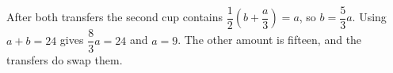 After both transfers the second cup contains $\dfrac{1}{2}(b+\dfrac{a}{3})=a$, so $b=\dfrac{5}{3}a$. Using $a+b=24$ gives $\dfrac{8}{3}a=24$ and $\boxed{a=9}$. The other amount is fifteen, and the transfers do swap them.
